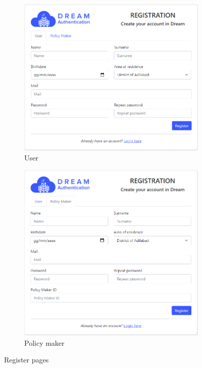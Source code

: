 \begin{figure}[h!]
\centering
\begin{subfigure}{.4\textwidth}
  \centering
  \includegraphics[width=1.075\linewidth]{images/interfaces/register_user.png}
  \caption{User}
  \label{fig:user_registration}
\end{subfigure}\hfill
\begin{subfigure}{.4\textwidth}
  \centering
  \includegraphics[width=1\linewidth]{images/interfaces/register.png}
  \caption{Policy maker}
  \label{fig:pm_registration}
\end{subfigure}%
\caption{Register pages}
\label{fig:user_pm_registration}
\end{figure}
\FloatBarrier


